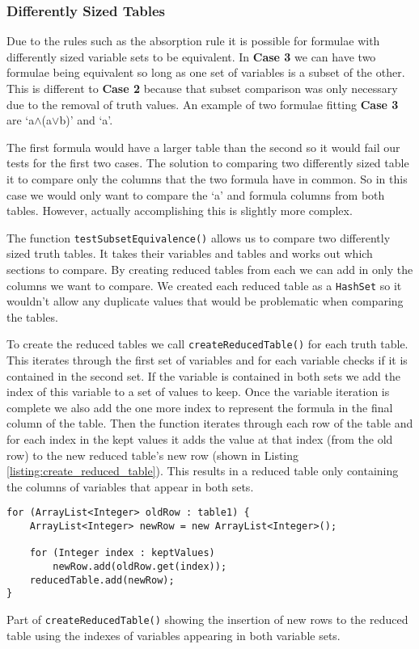 \documentclass{report}
\begin{document}
\subsubsection{Differently Sized Tables}

Due to the rules such as the absorption rule it is possible for formulae with differently sized variable sets to be equivalent. In \textbf{Case 3} we can have two formulae being equivalent so long as one set of variables is a subset of the other. This is different to \textbf{Case 2} because that subset comparison was only necessary due to the removal of truth values. An example of two formulae fitting \textbf{Case 3} are `a$\land$(a$\lor$b)' and `a'.

The first formula would have a larger table than the second so it would fail our tests for the first two cases. The solution to comparing two differently sized table it to compare only the columns that the two formula have in common. So in this case we would only want to compare the `a' and formula columns from both tables. However, actually accomplishing this is slightly more complex.

The function {\tt testSubsetEquivalence()} allows us to compare two differently sized truth tables. It takes their variables and tables and works out which sections to compare. By creating reduced tables from each we can add in only the columns we want to compare. We created each reduced table as a {\tt HashSet} so it wouldn't allow any duplicate values that would be problematic when comparing the tables.

To create the reduced tables we call {\tt createReducedTable()} for each truth table. This iterates through the first set of variables and for each variable checks if it is contained in the second set. If the variable is contained in both sets we add the index of this variable to a set of values to keep. Once the variable iteration is complete we also add the one more index to represent the formula in the final column of the table. Then the function iterates through each row of the table and for each index in the kept values it adds the value at that index (from the old row) to the new reduced table's new row (shown in Listing \ref{listing:create_reduced_table}). This results in a reduced table only containing the columns of variables that appear in both sets.

\begin{listing}[ht]
\begin{verbatim}
for (ArrayList<Integer> oldRow : table1) {
    ArrayList<Integer> newRow = new ArrayList<Integer>();
    
    for (Integer index : keptValues)
        newRow.add(oldRow.get(index));
    reducedTable.add(newRow);
}
\end{verbatim}
\caption{Part of {\tt createReducedTable()} showing the insertion of new rows to the reduced table using the indexes of variables appearing in both variable sets.}
\label{listing:create_reduced_table}
\end{listing}
\end{document}
